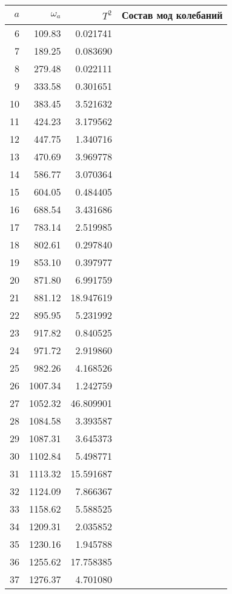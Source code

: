 \begin{tabular}{r|rr|l}
  \toprule
  $a$ &  $\omega_a$ & $T^2$ & Состав мод колебаний \\ 
  \midrule
  6  &  109.83  &  0.021741  & \\
  7  &  189.25  &  0.083690  & \\
  8  &  279.48  &  0.022111  & \\
  9  &  333.58  &  0.301651  & \\
  10 &  383.45  &  3.521632  & \\
  11 &  424.23  &  3.179562  & \\
  12 &  447.75  &  1.340716  & \\
  13 &  470.69  &  3.969778  & \\
  14 &  586.77  &  3.070364  & \\
  15 &  604.05  &  0.484405  & \\
  16 &  688.54  &  3.431686  & \\
  17 &      783.14  &  2.519985  & \\
  18 &      802.61  &  0.297840  & \\
  19 &      853.10  &  0.397977  & \\
  20 &      871.80  &  6.991759  & \\
  21 &      881.12  & 18.947619  & \\
  22 &      895.95  &  5.231992  & \\
  23 &      917.82  &  0.840525  & \\
  24 &      971.72  &  2.919860  & \\
  25 &      982.26  &  4.168526  & \\
  26 &     1007.34  &  1.242759  & \\
  27 &     1052.32  & 46.809901  & \\
  28 &     1084.58  &  3.393587  & \\
  29 &     1087.31  &  3.645373  & \\
  30 &     1102.84  &  5.498771  & \\
  31 &     1113.32  & 15.591687  & \\
  32 &     1124.09  &  7.866367  & \\
  33 &     1158.62  &  5.588525  & \\
  34 &     1209.31  &  2.035852  & \\
  35 &     1230.16  &  1.945788  & \\
  36 &     1255.62  & 17.758385  & \\
  37 &     1276.37  &  4.701080  & \\

\end{tabular}
